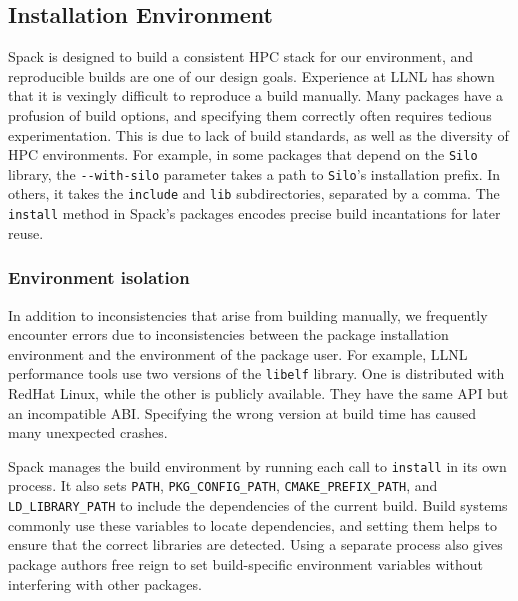 
\subsection{Installation Environment}

Spack is designed to build a consistent HPC stack for our
environment, and reproducible builds are one of our design goals.
Experience at LLNL has shown that it is vexingly difficult to reproduce
a build manually.
%
Many packages have a profusion of build options, and specifying
them correctly often requires tedious experimentation.  This is due to lack of
build standards, as well as the diversity of HPC environments.
For example, in some packages that depend on the {\tt Silo} library,
the \verb|--with-silo| parameter takes a path to {\tt Silo}'s installation prefix.
In others, it takes the {\tt include} and {\tt lib} subdirectories,
separated by a comma.
The {\tt install} method in Spack's packages encodes precise build
incantations for later reuse.

\subsubsection{Environment isolation}
In addition to inconsistencies that arise from building manually, we
frequently encounter errors due to inconsistencies between the package
installation environment and the environment of the package user.
%
For example, LLNL performance tools use two versions of the {\tt libelf}
library. One is distributed with RedHat Linux, while the
other is publicly available. They have the same API but an incompatible ABI.
Specifying the wrong version at build time has caused many
unexpected crashes.

Spack manages the build environment by running each call to {\tt install}
in its own process.  It also sets
{\tt PATH}, {\tt PKG\_CONFIG\_PATH}, {\tt CMAKE\_PREFIX\_PATH}, and
{\tt LD\_LIBRARY\_PATH} to include the dependencies of the current build.
Build systems commonly use these variables to locate dependencies,
and setting them helps to ensure that the correct libraries are detected.
Using a separate process also gives package authors 
free reign to set build-specific environment variables without interfering
with other packages.

